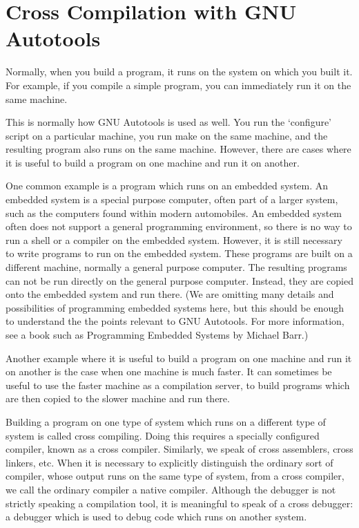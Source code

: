 \chapter{Cross Compilation with GNU Autotools}

Normally, when you build a program, it runs on the system on which you built it. For example, if you compile a simple program, you can immediately run it on the same machine.

This is normally how GNU Autotools is used as well. You run the `configure' script on a particular machine, you run make on the same machine, and the resulting program also runs on the same machine. However, there are cases where it is useful to build a program on one machine and run it on another.

One common example is a program which runs on an embedded system. An embedded system is a special purpose computer, often part of a larger system, such as the computers found within modern automobiles. An embedded system often does not support a general programming environment, so there is no way to run a shell or a compiler on the embedded system. However, it is still necessary to write programs to run on the embedded system. These programs are built on a different machine, normally a general purpose computer. The resulting programs can not be run directly on the general purpose computer. Instead, they are copied onto the embedded system and run there. (We are omitting many details and possibilities of programming embedded systems here, but this should be enough to understand the the points relevant to GNU Autotools. For more information, see a book such as Programming Embedded Systems by Michael Barr.)

Another example where it is useful to build a program on one machine and run it on another is the case when one machine is much faster. It can sometimes be useful to use the faster machine as a compilation server, to build programs which are then copied to the slower machine and run there.

Building a program on one type of system which runs on a different type of system is called cross compiling. Doing this requires a specially configured compiler, known as a cross compiler. Similarly, we speak of cross assemblers, cross linkers, etc. When it is necessary to explicitly distinguish the ordinary sort of compiler, whose output runs on the same type of system, from a cross compiler, we call the ordinary compiler a native compiler. Although the debugger is not strictly speaking a compilation tool, it is meaningful to speak of a cross debugger: a debugger which is used to debug code which runs on another system.


